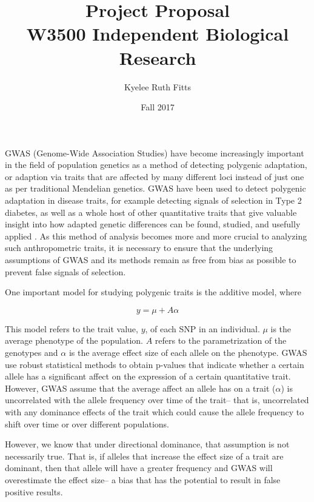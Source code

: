 \documentclass[a4paper,10pt]{article}
\begin{document}
\title{\vspace{-2.0cm}
  Project Proposal \\
  \large W3500 Independent Biological Research \\
}

\author{
  Kyelee Ruth Fitts
}

\date{Fall 2017}
  
\maketitle


GWAS (Genome-Wide Association Studies) have become increasingly
important in the field of population genetics as a method of detecting
polygenic adaptation, or adaption via traits that are affected by many
different loci instead of just one as per traditional Mendelian
genetics. GWAS have been used to detect polygenic adaptation in
disease traits, for example detecting signals of selection in Type 2
diabetes, as well as a whole host of other quantitative traits
that give valuable insight into how adapted genetic differences
can be found, studied, and usefully applied \cite{gwasintro}
\cite{gwasproblems} . As this method of
analysis becomes more and more crucial to analyzing such
anthropometric traits, it is necessary to ensure that the underlying
assumptions of GWAS and its methods remain as free from bias as
possible to prevent false signals of selection. 

One important model for studying polygenic traits is the additive model, where

\begin{equation}
  y = \mu + A\alpha
\end{equation}

This model refers to the trait value, $y$, of each SNP in an
individual. $\mu$ is the average phenotype of the population. $A$ refers to the
parametrization of the genotypes and $\alpha$ is the average effect size
of each allele on the phenotype. GWAS use robust statistical methods
to obtain p-values that indicate whether a certain allele has a
significant affect on the expression of a certain quantitative
trait. However, GWAS assume that the
average affect an allele has on a trait ($\alpha$) is uncorrelated with
the allele frequency over time of the trait-- that is, uncorrelated
with any dominance effects of the trait which could cause the allele
frequency to shift over time or over different populations.

However, we know that under directional dominance, that assumption is
not necessarily true. That is, if alleles that increase the effect
size of a trait are dominant, then that allele will have a greater
frequency and GWAS will overestimate the effect size-- a bias that has
the potential to result in false positive results.
\end{document}
